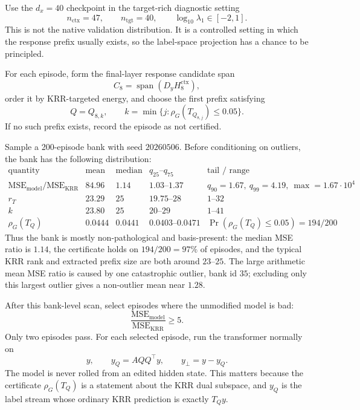 \documentclass[11pt]{article}
\newcommand{\spanop}{\operatorname{span}}
\begin{document}
Use the \(d_x=40\) checkpoint  in the target-rich diagnostic setting
\[
n_{\mathrm{ctx}}=47,
\qquad
n_{\mathrm{tgt}}=40,
\qquad
\log_{10}\lambda_1\in[-2,1].
\]
This is not the native validation distribution. It is a controlled setting in which the response
prefix usually exists, so the label-space projection has a chance to be principled.

For each episode, form the final-layer response candidate span
\[
C_8=\spanop(D_yH_8^{\mathrm{ctx}}),
\]
order it by KRR-targeted energy, and choose the first prefix satisfying
\[
Q=Q_{8,k},
\qquad
k=\min\{j:\rho_G(T_{Q_{8,j}})\le0.05\}.
\]
If no such prefix exists, record the episode as not certified.

Sample a 200-episode bank with seed \(20260506\). Before conditioning on outliers, the bank has the
following distribution:
\[
\begin{array}{c|cccc}
\text{quantity} & \text{mean} & \text{median} & q_{25}\text{--}q_{75} & \text{tail / range}\\
\hline
\mathrm{MSE}_{\mathrm{model}}/\mathrm{MSE}_{\mathrm{KRR}}
& 84.96 & 1.14 & 1.03\text{--}1.37 & q_{90}=1.67,\ q_{99}=4.19,\ \max=1.67\cdot10^4\\
r_T & 23.29 & 25 & 19.75\text{--}28 & 1\text{--}32\\
k & 23.80 & 25 & 20\text{--}29 & 1\text{--}41\\
\rho_G(T_Q) & 0.0444 & 0.0441 & 0.0403\text{--}0.0471 & \Pr(\rho_G(T_Q)\le0.05)=194/200
\end{array}
\]
Thus the bank is mostly non-pathological and basis-present: the median MSE ratio is \(1.14\), the
certificate holds on \(194/200=97\%\) of episodes, and the typical KRR rank and extracted prefix
size are both around \(23\)--\(25\). The large arithmetic mean MSE ratio is caused by one
catastrophic outlier, bank id \(35\); excluding only this largest outlier gives a non-outlier mean
near \(1.28\).

After this bank-level scan, select episodes where the unmodified model is bad:
\[
\frac{\mathrm{MSE}_{\mathrm{model}}}{\mathrm{MSE}_{\mathrm{KRR}}}\ge5.
\]
Only two episodes pass. For each selected episode, run the transformer normally on
\[
y,\qquad y_Q=AQQ^\top y,\qquad y_\perp=y-y_Q.
\]
The model is never rolled from an edited hidden state. This matters because the certificate
\(\rho_G(T_Q)\) is a statement about the KRR dual subspace, and \(y_Q\) is the label stream whose
ordinary KRR prediction is exactly \(T_Qy\).
\end{document}
